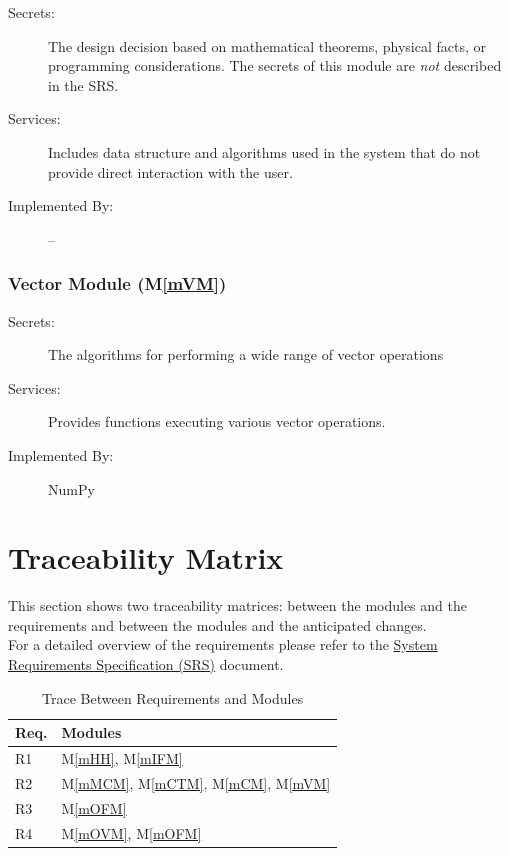 \documentclass[12pt, titlepage]{article}
\newcommand{\mref}[1]{M\ref{#1}}
\begin{document}
\begin{description}
\item[Secrets:] The design decision based on mathematical theorems, physical
  facts, or programming considerations. The secrets of this module are
  \emph{not} described in the SRS.
\item[Services:] Includes data structure and algorithms used in the system that
  do not provide direct interaction with the user. 
\item[Implemented By:] --
\end{description}

\subsubsection{Vector Module (\mref{mVM})}

\begin{description}
\item[Secrets:]The algorithms for performing a wide range of vector operations
\item[Services:]Provides functions executing various vector operations.
\item[Implemented By:] NumPy
\end{description}


\section{Traceability Matrix} \label{SecTM}

This section shows two traceability matrices: between the modules and the
requirements and between the modules and the anticipated changes.
\\
For a detailed overview of the \progname{} requirements please refer to the  \href{https://github.com/rnorouziani/Helmholtz-Coil-Current-Calculator-CAS741/blob/main/docs/SRS/SRS.pdf}{System Requirements Specification (SRS)} document.

\begin{table}[H]
\centering
\begin{tabular}{p{} p{}}
\toprule
\textbf{Req.} & \textbf{Modules}\\
\midrule
R1 & \mref{mHH}, \mref{mIFM}\\
R2 & \mref{mMCM}, \mref{mCTM}, \mref{mCM}, \mref{mVM}\\
R3 & \mref{mOFM}\\
R4 & \mref{mOVM}, \mref{mOFM}\\

\bottomrule
\end{tabular}
\caption{Trace Between Requirements and Modules}
\label{TblRT}
\end{table}
\end{document}
